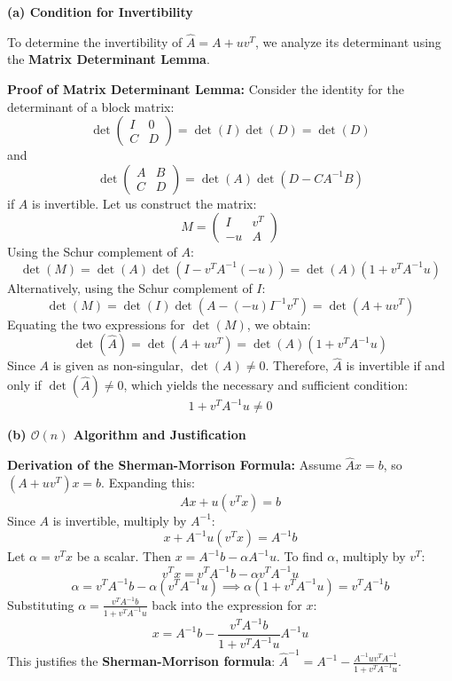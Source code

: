 \begin{solution}
\textbf{(a) Condition for Invertibility}

To determine the invertibility of $\widehat{A} = A + uv^T$, we analyze its determinant using the \textbf{Matrix Determinant Lemma}. 

\textbf{Proof of Matrix Determinant Lemma:}
Consider the identity for the determinant of a block matrix:
\[ \det \begin{pmatrix} I & 0 \\ C & D \end{pmatrix} = \det(I) \det(D) = \det(D) \]
and
\[ \det \begin{pmatrix} A & B \\ C & D \end{pmatrix} = \det(A) \det(D - CA^{-1}B) \]
if $A$ is invertible. Let us construct the matrix:
\[ M = \begin{pmatrix} I & v^T \\ -u & A \end{pmatrix} \]
Using the Schur complement of $A$:
\[ \det(M) = \det(A) \det(I - v^T A^{-1}(-u)) = \det(A) (1 + v^T A^{-1} u) \]
Alternatively, using the Schur complement of $I$:
\[ \det(M) = \det(I) \det(A - (-u)I^{-1}v^T) = \det(A + uv^T) \]
Equating the two expressions for $\det(M)$, we obtain:
\[ \det(\widehat{A}) = \det(A + uv^T) = \det(A)(1 + v^T A^{-1} u) \]
Since $A$ is given as non-singular, $\det(A) \neq 0$. Therefore, $\widehat{A}$ is invertible if and only if $\det(\widehat{A}) \neq 0$, which yields the necessary and sufficient condition:
\[ \boxed{1 + v^T A^{-1} u \neq 0} \]

\textbf{(b) $\mathcal{O}(n)$ Algorithm and Justification}

\textbf{Derivation of the Sherman-Morrison Formula:}
Assume $\widehat{A}x = b$, so $(A + uv^T)x = b$. Expanding this:
\[ Ax + u(v^T x) = b \]
Since $A$ is invertible, multiply by $A^{-1}$:
\[ x + A^{-1}u(v^T x) = A^{-1}b \]
Let $\alpha = v^T x$ be a scalar. Then $x = A^{-1}b - \alpha A^{-1}u$. To find $\alpha$, multiply by $v^T$:
\[ v^T x = v^T A^{-1} b - \alpha v^T A^{-1} u \]
\[ \alpha = v^T A^{-1} b - \alpha (v^T A^{-1} u) \implies \alpha (1 + v^T A^{-1} u) = v^T A^{-1} b \]
Substituting $\alpha = \frac{v^T A^{-1} b}{1 + v^T A^{-1} u}$ back into the expression for $x$:
\[ x = A^{-1}b - \frac{v^T A^{-1} b}{1 + v^T A^{-1} u} A^{-1} u \]
This justifies the \textbf{Sherman-Morrison formula}: $\widehat{A}^{-1} = A^{-1} - \frac{A^{-1} u v^T A^{-1}}{1 + v^T A^{-1} u}$.


\end{solution}

